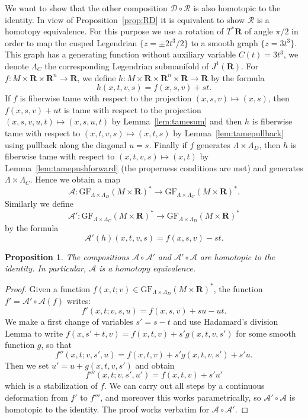 \documentclass[12pt,a4paper]{article}
\numberwithin{equation}{section}
\newtheorem{proposition}[equation]{Proposition}
\theoremstyle{definition}
\theoremstyle{remark}
\newcommand{\A}{\mathcal{A}}
\newcommand{\R}{\mathbf{R}}
\newcommand{\DD}{\mathcal{D}}
\newcommand{\RR}{\mathcal{R}}
\newcommand{\GF}{\mathrm{GF}}
\begin{document}
We want to show that the other composition $\DD\circ \RR$ is also homotopic to the identity. In view of Proposition~\ref{prop:RD}
it is equivalent to show $\RR$ is a homotopy equivalence.
For this purpose we use a rotation of $T^* \R$ of angle $\pi/2$ in order to map the cusped Legendrian $\{z=\pm 2t^3/2\}$
to a smooth graph $\{z=3t^3\}$. This graph has a generating function without auxiliary variable $C(t)=3t^3$, we denote $\Lambda_C$ the corresponding
Legendrian submanifold of $J^1(\R)$.
For $f:M\times \R \times \R^n \to \R$, we define
$h:M\times \R \times \R^n \times \R \to \R$ by the formula
\[h(x,t,v,s)=f(x,s,v)+st.\]
If $f$ is fiberwise tame with respect to the projection $(x,s,v)\mapsto (x,s)$, then $f(x,s,v)+ut$ is tame with respect to the projection $(x,s,v,u,t)\mapsto (x,s,u,t)$
by Lemma~\ref{lem:tamesum} and then $h$ is fiberwise tame with respect to $(x,t,v,s)\mapsto (x,t,s)$ by Lemma~\ref{lem:tamepullback} using pullback along the diagonal $u=s$.
Finally if $f$ generates $\Lambda\times \Lambda_D$, then $h$ is fiberwise tame with respect to $(x,t,v,s)\mapsto (x,t)$ by Lemma~\ref{lem:tamepushforward}
(the properness conditions are met) and generates $\Lambda\times \Lambda_C$.
Hence we obtain a map
\[\A:\GF_{\Lambda\times \Lambda_D}(M\times \R)^*\to \GF_{\Lambda\times \Lambda_C}(M\times \R)^*.\]
Similarly we define
\[\A':\GF_{\Lambda\times \Lambda_C}(M\times \R)^*\to \GF_{\Lambda\times \Lambda_D}(M\times \R)^*\]
by the formula
\[\A'(h)(x,t,v,s)=f(x,s,v)-st.\]

\begin{proposition}\label{prop:Aequiv}
The compositions $\A\circ \A'$ and $\A'\circ \A$ are homotopic to the identity. In particular, $\A$ is a homotopy equivalence.
\end{proposition}
\begin{proof}
Given a function $f(x,t;v)\in \GF_{\Lambda\times \Lambda_D}(M\times \R)^*$, the function $f'=\A'\circ \A(f)$ writes:
\[f'(x,t;v,s,u)=f(x,s,v)+su-ut.\]
We make a first change of variables $s'=s-t$ and use Hadamard's division Lemma to write
$f(x,s'+t,v)=f(x,t,v)+s'g(x,t,v,s')$ for some smooth function $g$, so that
\[f''(x,t;v,s',u)=f(x,t,v)+s'g(x,t,v,s')+s'u.\]
Then we set $u'=u+g(x,t,v,s')$ and obtain
\[f'''(x,t;v,s',u')=f(x,t,v)+s'u'\]
which is a stabilization of $f$. We can carry out all steps by a continuous
deformation from $f'$ to $f'''$, and moreover this works parametrically, so $\A'\circ\A$
is homotopic to the identity. The proof works verbatim for $\A\circ \A'$.
\end{proof}
\end{document}
